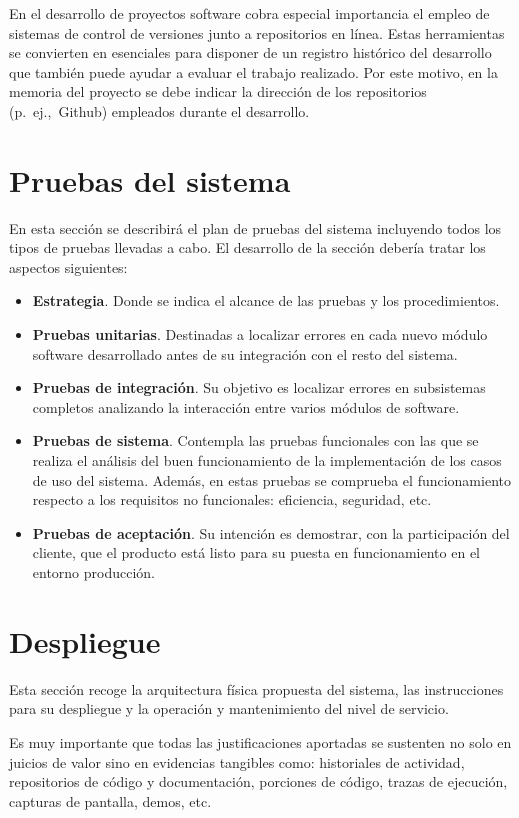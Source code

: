 En el desarrollo de proyectos software cobra especial importancia el empleo de sistemas de control de versiones junto a repositorios en línea. Estas herramientas se convierten en esenciales para disponer de un registro histórico del desarrollo que también puede ayudar a evaluar el trabajo realizado. Por este motivo, en la memoria del proyecto se debe indicar la dirección de los repositorios (p.~ej.,~Github) empleados durante el desarrollo.

\section{Pruebas del sistema}
En esta sección se describirá el plan de pruebas del sistema incluyendo todos los tipos de pruebas llevadas a cabo. El desarrollo de la sección debería tratar los aspectos siguientes:
\begin{itemize}
\item \textbf{Estrategia}. Donde se indica el alcance de las pruebas y los procedimientos.

\item \textbf{Pruebas unitarias}. Destinadas a localizar errores en cada nuevo módulo software desarrollado antes de su integración con el resto del sistema.

\item \textbf{Pruebas de integración}. Su objetivo es localizar errores en subsistemas completos analizando la interacción entre varios módulos de software.

\item \textbf{Pruebas de sistema}. Contempla las pruebas funcionales con las que se realiza el análisis del buen funcionamiento de la implementación de los casos de uso del sistema. Además, en estas pruebas se comprueba el funcionamiento respecto a los requisitos no funcionales: eficiencia, seguridad, etc.

\item \textbf{Pruebas de aceptación}. Su intención es demostrar, con la participación del cliente, que el producto está listo para su puesta en funcionamiento en el entorno producción.
\end{itemize}

\section{Despliegue}
Esta sección recoge la arquitectura física propuesta del sistema, las instrucciones para su despliegue y la operación y mantenimiento del
nivel de servicio.

Es muy importante que todas las justificaciones aportadas se sustenten no solo en juicios de valor sino en evidencias tangibles como: historiales de actividad, repositorios de código y documentación, porciones de código, trazas de ejecución, capturas de pantalla, demos, etc.
